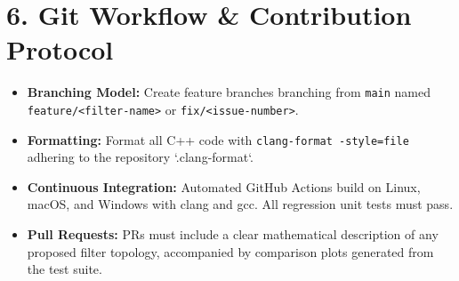 \documentclass[11pt,a4paper]{article}
\begin{document}
\section*{6. Git Workflow \& Contribution Protocol}
\begin{itemize}[leftmargin=20pt,itemsep=2pt]
\item \textbf{Branching Model:} Create feature branches branching from \texttt{main} named \texttt{feature/<filter-name>} or \texttt{fix/<issue-number>}.
\item \textbf{Formatting:} Format all C++ code with \texttt{clang-format -style=file} adhering to the repository `.clang-format`.
\item \textbf{Continuous Integration:} Automated GitHub Actions build on Linux, macOS, and Windows with clang and gcc. All regression unit tests must pass.
\item \textbf{Pull Requests:} PRs must include a clear mathematical description of any proposed filter topology, accompanied by comparison plots generated from the test suite.
\end{itemize}
\end{document}
